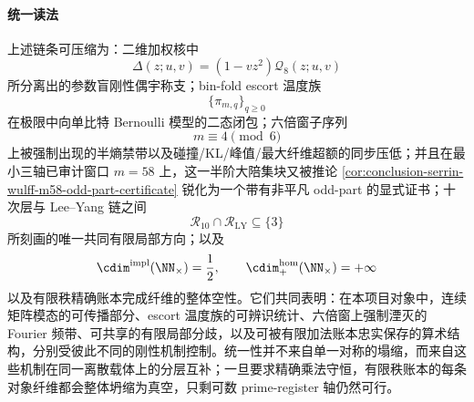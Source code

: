 \paragraph{统一读法}
上述链条可压缩为：二维加权核中
\[
\Delta(z;u,v)=(1-vz^2)\mathcal Q_8(z;u,v)
\]
所分离出的参数盲刚性偶宇称支；bin-fold escort 温度族
\[
\{\pi_{m,q}\}_{q\ge 0}
\]
在极限中向单比特 Bernoulli 模型的二态闭包；六倍窗子序列
\[
m\equiv 4\pmod 6
\]
上被强制出现的半熵禁带以及碰撞/KL/峰值/最大纤维超额的同步压低；并且在最小三轴已审计窗口 \(m=58\) 上，这一半阶大陪集块又被推论 \ref{cor:conclusion-serrin-wulff-m58-odd-part-certificate} 锐化为一个带有非平凡 odd-part 的显式证书；十次层与 Lee--Yang 链之间
\[
\mathcal R_{10}\cap \mathcal R_{\mathrm{LY}}\subseteq \{3\}
\]
所刻画的唯一共同有限局部方向；以及
\[
\cdim^{\mathrm{impl}}(\NN_{\times})=\frac12,
\qquad
\cdim^{\mathrm{hom}}_{+}(\NN_{\times})=+\infty
\]
以及有限秩精确账本完成纤维的整体空性。它们共同表明：在本项目对象中，连续矩阵模态的可传播部分、escort 温度族的可辨识统计、六倍窗上强制湮灭的 Fourier 频带、可共享的有限局部分歧，以及可被有限加法账本忠实保存的算术结构，分别受彼此不同的刚性机制控制。统一性并不来自单一对称的塌缩，而来自这些机制在同一离散载体上的分层互补；一旦要求精确乘法守恒，有限秩账本的每条对象纤维都会整体坍缩为真空，只剩可数 prime-register 轴仍然可行。

\endinput
